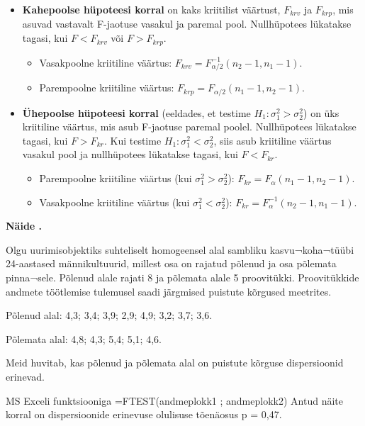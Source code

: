 \documentclass[
]{book}
\providecommand{\tightlist}{%
  \setlength{\itemsep}{0pt}\setlength{\parskip}{0pt}}
\newcounter{naidis}[chapter]
\newenvironment{naidis}
{%
\definecolor{shadecolor}{rgb}{200, 200, 0}
\par\parindent 0pt
\begin{framed}
\begin{naitefont}
\refstepcounter{naidis}\textbf{Näide \thenaidis.}
}
{%
\end{naitefont}%
\end{framed}
}%
\begin{document}
\begin{itemize}
\tightlist
\item
  \textbf{Kahepoolse hüpoteesi korral} on kaks kriitilist väärtust, \(F_{krv}\) ja \(F_{krp}\), mis asuvad vastavalt F-jaotuse vasakul ja paremal pool. Nullhüpotees lükatakse tagasi, kui \(F < F_{krv}\) või \(F > F_{krp}\).

  \begin{itemize}
  \tightlist
  \item
    Vasakpoolne kriitiline väärtus: \(F_{krv} = F^{-1}_{\alpha/2}(n_2 - 1, n_1 - 1)\).
  \item
    Parempoolne kriitiline väärtus: \(F_{krp} = F_{\alpha/2}(n_1 - 1, n_2 - 1)\).
  \end{itemize}
\item
  \textbf{Ühepoolse hüpoteesi korral} (eeldades, et testime \(H_1: \sigma_1^2 > \sigma_2^2\)) on üks kriitiline väärtus, mis asub F-jaotuse paremal poolel. Nullhüpotees lükatakse tagasi, kui \(F > F_{kr}\). Kui testime \(H_1: \sigma_1^2 < \sigma_2^2\), siis asub kriitiline väärtus vasakul pool ja nullhüpotees lükatakse tagasi, kui \(F<F_{kr}\).

  \begin{itemize}
  \tightlist
  \item
    Parempoolne kriitiline väärtus (kui \(\sigma_1^2 > \sigma_2^2\)): \(F_{kr} = F_{\alpha}(n_1 - 1, n_2 - 1)\).
  \item
    Vasakpoolne kriitiline väärtus (kui \(\sigma_1^2 < \sigma_2^2\)): \(F_{kr} = F^{-1}_{\alpha}(n_2 - 1, n_1 - 1)\).
  \end{itemize}
\end{itemize}

\begin{naidis}
Olgu uurimisobjektiks suhteliselt homogeensel alal sambliku kasvu¬koha¬tüübi 24-aastased männikultuurid, millest osa on rajatud põlenud ja osa põlemata pinna¬sele. Põlenud alale rajati 8 ja põlemata alale 5 proovitükki. Proovitükkide andmete töötlemise tulemusel saadi järgmised puistute kõrgused meetrites.

Põlenud alal: 4,3; 3,4; 3,9; 2,9; 4,9; 3,2; 3,7; 3,6.

Põlemata alal: 4,8; 4,3; 5,4; 5,1; 4,6.
\end{naidis}

Meid huvitab, kas põlenud ja põlemata alal on puistute kõrguse dispersioonid erinevad.

MS Exceli funktsiooniga
=FTEST(andmeplokk1 ; andmeplokk2)
Antud näite korral on dispersioonide erinevuse olulisuse tõenäosus p = 0,47.
\end{document}
